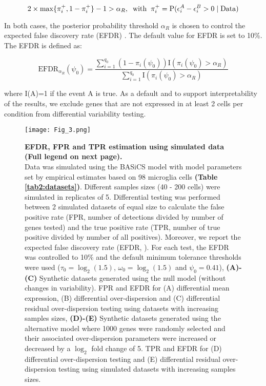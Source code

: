 \begin{equation} \label{eq::decision_rule2} 2 \times \max\{\pi_i^+, 1-\pi_i^+\} - 1  >\alpha_R, \hspace{0.2cm} \text{with} \hspace{0.2cm} \pi_i^+ = \text{P}(\epsilon_i^{A}-\epsilon_i^{B} > 0 \mid \text{Data})
\end{equation}

In both cases, the posterior probability threshold $\alpha_R$ is chosen to control the expected false discovery rate (EFDR) \citep{Newton2004}. The default value for EFDR is set to 10\%. The EFDR is defined as:

\begin{equation}
\text{EFDR}_{\alpha_R}(\psi_0)=\frac{\sum_{i=1}^{q_0}(1-\pi_i(\psi_0))\text{I}(\pi_i(\psi_0)>\alpha_R)}{\sum_{i=1}^{q_0}\text{I}(\pi_i(\psi_0)>\alpha_R)}
\end{equation}

where I(A)=1 if the event A is true. 
As a default and to support interpretability of the results, we exclude genes that are not expressed in at least 2 cells per condition from differential variability testing.

\newpage

\begin{figure}[!h]
\centering
\texttt{[image: Fig\_3.png]}
\caption[EFDR, FPR and TPR estimation using simulated data]{\textbf{EFDR, FPR and TPR estimation using simulated data (Full legend on next page).}\\
Data was simulated using the BASiCS model with model parameters set by empirical estimates based on 98 microglia cells \citep{Zeisel2015} \textbf{(Table \ref{tab2:datasets})}. 
Different samples sizes (40 - 200 cells) were simulated in replicates of 5. 
Differential testing was performed between 2 simulated datasets of equal size to calculate the false positive rate (FPR, number of detections divided by number of genes tested) and the true positive rate (TPR, number of true positive divided by number of all positives). 
Moreover, we report the expected false discovery rate (EFDR, \citep{Newton2004}). 
For each test, the EFDR was controlled to 10\% and the default minimum tolerance thresholds were used ($\tau_0 = \log_2(1.5)$, $\omega_0 = \log_2(1.5)$ and $\psi_0 = 0.41$), 
\textbf{(A)-(C)} Synthetic datasets generated using the null model (without changes in variability). FPR and EFDR for (A) differential mean expression, (B) differential over-dispersion and (C) differential residual over-dispersion testing using datasets with increasing samples sizes, 
\textbf{(D)-(E)} Synthetic datasets generated using the alternative model where 1000 genes were randomly selected and their associated over-dispersion parameters were increased or decreased by a $\log_2$ fold change of 5. 
TPR and EFDR for (D) differential over-dispersion testing and (E) differential residual over-dispersion testing using simulated datasets with increasing samples sizes.}\label{fig2:EFDR}
\end{figure}

